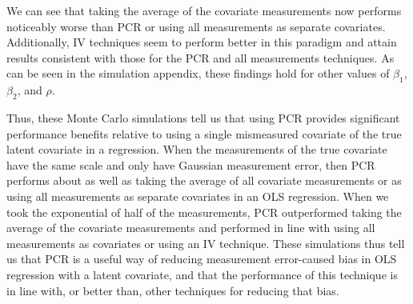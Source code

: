 \documentclass[10pt]{article}
\begin{document}
        \begin{table}[!htbp] \centering
            \caption{Average Coefficients for Values of $\rho$ (Half of Measurements are Transformed) \label{sim_rho_5_exp}}
        \end{table}


        We can see that taking the average of the covariate measurements now performs noticeably worse than PCR or using all measurements as separate covariates. Additionally, IV techniques seem to perform better in this paradigm and attain results consistent with those for the PCR and all measurements techniques. As can be seen in the simulation appendix, these findings hold for other values of $\beta_1$, $\beta_2$, and $\rho$.

        Thus, these Monte Carlo simulations tell us that using PCR provides significant performance benefits relative to using a single mismeasured covariate of the true latent covariate in a regression. When the measurements of the true covariate have the same scale and only have Gaussian measurement error, then PCR performs about as well as taking the average of all covariate measurements or as using all measurements as separate covariates in an OLS regression. When we took the exponential of half of the measurements, PCR outperformed taking the average of the covariate measurements and performed in line with using all measurements as covariates or using an IV technique. These simulations thus tell us that PCR is a useful way of reducing measurement error-caused bias in OLS regression with a latent covariate, and that the performance of this technique is in line with, or better than, other techniques for reducing that bias.
\end{document}
